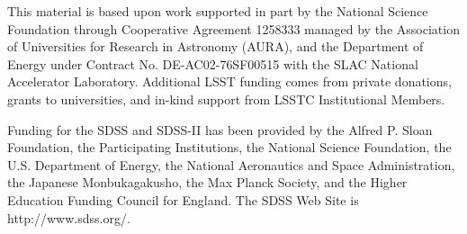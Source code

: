 \documentclass{aastex62}
\begin{document}
 


\acknowledgments

This material is based upon work supported in part by the National Science Foundation through
Cooperative Agreement 1258333 managed by the Association of Universities for Research in Astronomy
(AURA), and the Department of Energy under Contract No. DE-AC02-76SF00515 with the SLAC National
Accelerator Laboratory. Additional LSST funding comes from private donations, grants to universities,
and in-kind support from LSSTC Institutional Members.

Funding for the SDSS and SDSS-II has been provided by the Alfred
P. Sloan Foundation, the Participating Institutions, the National
Science Foundation, the U.S. Department of Energy, the National
Aeronautics and Space Administration, the Japanese Monbukagakusho, the
Max Planck Society, and the Higher Education Funding Council for
England. The SDSS Web Site is http://www.sdss.org/.



\end{document}
